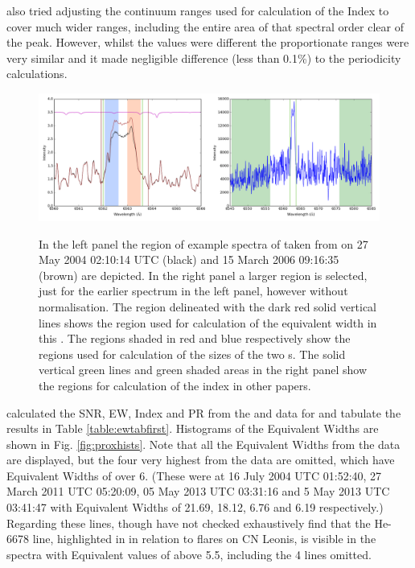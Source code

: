 {\FirstP} also tried adjusting the continuum ranges used for calculation of the {\ha} Index to cover much wider ranges,
including the entire area of that spectral order clear of the {\ha} peak. However, whilst the values were different the
proportionate ranges were very similar and it made negligible difference (less than 0.1\%) to the periodicity
calculations.

\begin{figure}[!htbp]
\begin{center}
\includegraphics[scale=0.25]{Figures/harpsfirstha4.png} \\
\end{center}   
\caption{In the left panel the {\ha} region of example spectra of {\prox} taken from {\harps} on 27 May 2004 02:10:14
  UTC (black) and 15 March 2006 09:16:35 (brown) are depicted. In the right panel a larger region is selected, just for
  the earlier spectrum in the left panel, however without normalisation. The region delineated with the dark red solid
  vertical lines shows the region used for calculation of the {\ha} equivalent width in this \paperorthesis. The regions
  shaded in red and blue respectively show the regions used for calculation of the sizes of the two \horn s. The solid
  vertical green lines and green shaded areas in the right panel show the regions for calculation of the {\ha} index in
  other papers.%
}
 \protect\label{fig:harpsfirstha}
\end{figure}

{\FirstP} calculated the SNR, EW, {\ha} Index and PR from the {\uves} and {\harps} data for {\prox} and tabulate the
results in Table \ref{table:ewtabfirst}. Histograms of the Equivalent Widths are shown in Fig. \ref{fig:proxhists}. Note
that all the Equivalent Widths from the {\uves} data are displayed, but the four very highest from the {\harps} data are
omitted, which have Equivalent Widths of over 6. (These were at 16 July 2004 UTC 01:52:40, 27 March 2011 UTC 05:20:09,
05 May 2013 UTC 03:31:16 and 5 May 2013 UTC 03:41:47 with Equivalent Widths of 21.69, 18.12, 6.76 and 6.19
respectively.) Regarding these lines, though {\Firstp} have not checked exhaustively {\Firstp} find that the He-6678
line, highlighted in \citet[fig. 8]{fuhrmeister08} in relation to flares on CN Leonis, is visible in the spectra with
{\ha} Equivalent values of above 5.5, including the 4 lines omitted.

